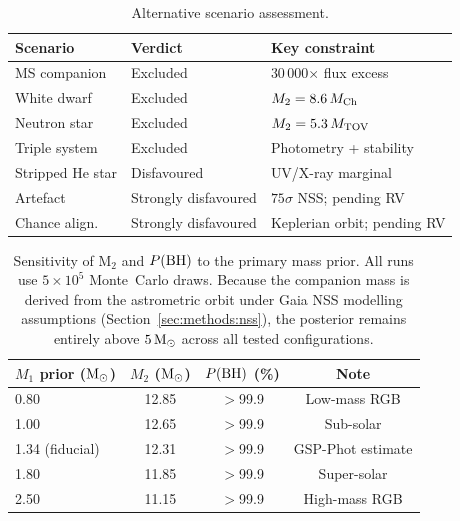 \documentclass[usenatbib,fleqn]{mnras}
\newcommand{\Msun}{{\rm M}_\odot}
\begin{document}
\begin{table}
\centering
\caption{Alternative scenario assessment.}
\label{tab:scenarios}
\begin{tabular}{lll}
\toprule
Scenario & Verdict & Key constraint \\
\midrule
MS companion    & Excluded     & 30\,000$\times$ flux excess \\
White dwarf     & Excluded     & $M_2 = 8.6\,M_{\rm Ch}$ \\
Neutron star    & Excluded     & $M_2 = 5.3\,M_{\rm TOV}$ \\
Triple system   & Excluded     & Photometry + stability \\
Stripped He star & Disfavoured & UV/X-ray marginal \\
Artefact        & Strongly disfavoured & $75\sigma$ NSS; pending RV \\
Chance align.   & Strongly disfavoured & Keplerian orbit; pending RV \\
\bottomrule
\end{tabular}
\end{table}

\begin{table}
\centering
\caption{Sensitivity of M$_2$ and $P({\rm BH})$ to the primary mass
prior.  All runs use $5 \times 10^5$ Monte~Carlo draws.  Because the
companion mass is derived from the astrometric orbit under Gaia NSS
modelling assumptions (Section~\ref{sec:methods:nss}), the posterior
remains entirely above $5\,\Msun$ across all tested configurations.}
\label{tab:sensitivity}
\begin{tabular}{lccc}
\toprule
$M_1$ prior ($\Msun$) & $M_2$ ($\Msun$) & $P({\rm BH})$ (\%) &
Note \\
\midrule
0.80 & 12.85 & $>$99.9 & Low-mass RGB \\
1.00 & 12.65 & $>$99.9 & Sub-solar \\
1.34 (fiducial) & 12.31 & $>$99.9 & GSP-Phot estimate \\
1.80 & 11.85 & $>$99.9 & Super-solar \\
2.50 & 11.15 & $>$99.9 & High-mass RGB \\
\bottomrule
\end{tabular}
\end{table}
\end{document}
